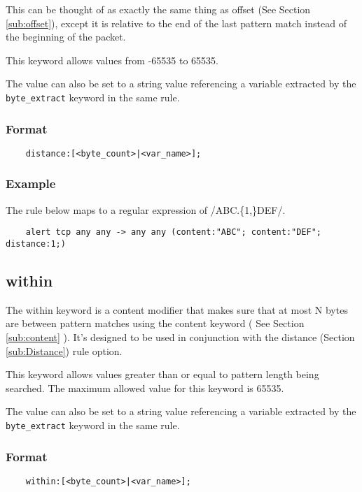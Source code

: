 \documentclass[english]{report}
\begin{document}
This can be thought of as exactly the same thing as offset (See Section
\ref{sub:offset}), except it is relative to the end of the last pattern match
instead of the beginning of the packet.

This keyword allows values from -65535 to 65535.

The value can also be set to a string value referencing a variable extracted by the
\texttt{byte\_extract} keyword in the same rule.

\subsubsection{Format}

\begin{verbatim}
    distance:[<byte_count>|<var_name>];
\end{verbatim}

\subsubsection{Example}

The rule below maps to a regular expression of /ABC.\{1,\}DEF/.

\begin{verbatim}
    alert tcp any any -> any any (content:"ABC"; content:"DEF"; distance:1;)
\end{verbatim}

\subsection{within}
\label{sub:Within}

The within keyword is a content modifier that makes sure that at most N bytes
are between pattern matches using the content keyword ( See Section
\ref{sub:content} ).  It's designed to be used in conjunction with the distance
(Section \ref{sub:Distance}) rule option.

This keyword allows values greater than or equal to pattern length being searched. 
The maximum allowed value for this keyword is 65535.

The value can also be set to a string value referencing a variable extracted by the
\texttt{byte\_extract} keyword in the same rule.

\subsubsection{Format}

\begin{verbatim}
    within:[<byte_count>|<var_name>];
\end{verbatim}
\end{document}
